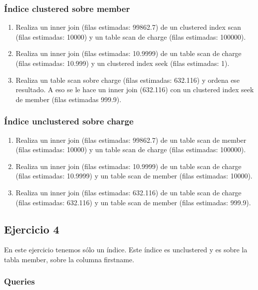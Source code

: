 \subsubsection{Índice clustered sobre member}
\begin{enumerate}[label=(\alph*)]
  \item Realiza un inner join (filas estimadas: 99862.7) de un clustered index scan (filas estimadas: 10000) y un table scan de charge (filas estimadas: 100000).
  \item Realiza un inner join (filas estimadas: 10.9999) de un table scan de charge (filas estimadas: 10.999) y un clustered index seek (filas estimadas: 1).
  \item Realiza un table scan sobre charge (filas estimadas: 632.116) y ordena ese resultado. A eso se le hace un inner join (632.116) con un clustered index seek de member (filas estimadas 999.9).
\end{enumerate}

\subsubsection{Índice unclustered sobre charge}
\begin{enumerate}[label=(\alph*)]
  \item Realiza un inner join (filas estimadas: 99862.7) de un table scan de member (filas estimadas: 10000) y un table scan de charge (filas estimadas: 100000).
  \item Realiza un inner join (filas estimadas: 10.9999) de un table scan de charge (filas estimadas: 10.9999) y un table scan de member (filas estimadas: 10000).
  \item Realiza un inner join (filas estimadas: 632.116) de un table scan de charge (filas estimadas: 632.116) y un table scan de member (filas estimadas: 999.9).
\end{enumerate}



\subsection{Ejercicio 4}

En este ejercicio tenemos sólo un índice. Este índice es unclustered y es sobre la tabla member, sobre la columna firstname.

\subsubsection{Queries}

